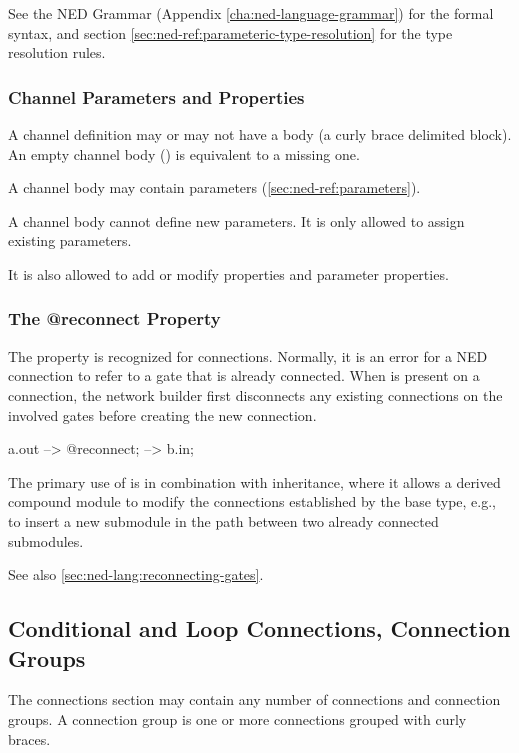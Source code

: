 See the NED Grammar (Appendix \ref{cha:ned-language-grammar}) for the
formal syntax, and section \ref{sec:ned-ref:parameteric-type-resolution}
for the type resolution rules.


\subsubsection{Channel Parameters and Properties}
\label{sec:ned-ref:channel-parameters-and-properties}

A channel definition may or may not have a body (a curly brace
delimited block). An empty channel body (\ttt{\{ \}}) is equivalent
to a missing one.

A channel body may contain parameters (\ref{sec:ned-ref:parameters}).

A channel body cannot define new parameters. It is only
allowed to assign existing parameters.

It is also allowed to add or modify properties and parameter properties.


\subsubsection{The @reconnect Property}
\label{sec:ned-ref:reconnect-property}

The  property is recognized for connections. Normally, it is
an error for a NED connection to refer to a gate that is already connected.
When  is present on a connection, the network builder first
disconnects any existing connections on the involved gates before creating the
new connection.

\begin{ned}
a.out --> {@reconnect;} --> b.in;
\end{ned}

The primary use of  is in combination with inheritance,
where it allows a derived compound module to modify the connections established
by the base type, e.g., to insert a new submodule in the path between two
already connected submodules.

See also \ref{sec:ned-lang:reconnecting-gates}.


\subsection{Conditional and Loop Connections, Connection Groups}
\label{sec:ned-ref:connection-groups}

The connections section may contain any number of connections and
connection groups. A connection group is one or more connections
grouped with curly braces.

